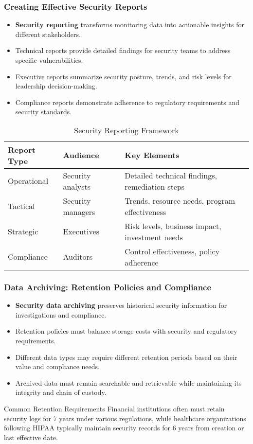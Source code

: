 \documentclass{beamer}
\begin{document}
\begin{frame}
\frametitle{Creating Effective Security Reports}
\begin{itemize}
\item \textbf{Security reporting} transforms monitoring data into actionable insights for different stakeholders.
\item Technical reports provide detailed findings for security teams to address specific vulnerabilities.
\item Executive reports summarize security posture, trends, and risk levels for leadership decision-making.
\item Compliance reports demonstrate adherence to regulatory requirements and security standards.
\end{itemize}

\begin{table}
\scriptsize
\begin{tabular}{lll}
\toprule
\textbf{Report Type} & \textbf{Audience} & \textbf{Key Elements} \\
\midrule
Operational & Security analysts & Detailed technical findings, remediation steps \\
Tactical & Security managers & Trends, resource needs, program effectiveness \\
Strategic & Executives & Risk levels, business impact, investment needs \\
Compliance & Auditors & Control effectiveness, policy adherence \\
\bottomrule
\end{tabular}
\caption{Security Reporting Framework}
\end{table}
\end{frame}

\begin{frame}
\frametitle{Data Archiving: Retention Policies and Compliance}
\begin{itemize}
\item \textbf{Security data archiving} preserves historical security information for investigations and compliance.
\item Retention policies must balance storage costs with security and regulatory requirements.
\item Different data types may require different retention periods based on their value and compliance needs.
\item Archived data must remain searchable and retrievable while maintaining its integrity and chain of custody.
\end{itemize}

\begin{exampleblock}{Common Retention Requirements}
Financial institutions often must retain security logs for 7 years under various regulations, while healthcare organizations following HIPAA typically maintain security records for 6 years from creation or last effective date.
\end{exampleblock}
\end{frame}
\end{document}
